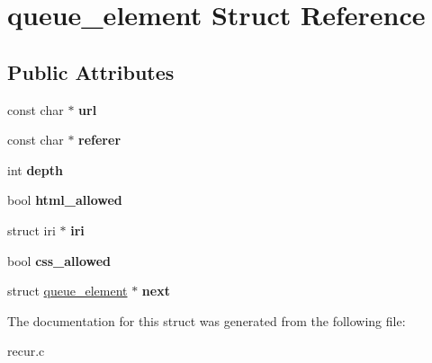 \hypertarget{structqueue__element}{}\section{queue\+\_\+element Struct Reference}
\label{structqueue__element}
\subsection*{Public Attributes}
\begin{DoxyCompactItemize}
\item 
\mbox{\label{structqueue__element_ada8ba081f1fb8d803d75e912253a98ef}} 
const char $\ast$ {\bfseries url}
\item 
\mbox{\label{structqueue__element_aa86f466176eda76217b5ed7e692e042b}} 
const char $\ast$ {\bfseries referer}
\item 
\mbox{\label{structqueue__element_a06c215d33862fbb93c966f25530bcffd}} 
int {\bfseries depth}
\item 
\mbox{\label{structqueue__element_a2b2daa4d3b83079c3745b557f6eed6f7}} 
bool {\bfseries html\+\_\+allowed}
\item 
\mbox{\label{structqueue__element_ab992d1d3fe3eacc2a6176f3052100199}} 
struct iri $\ast$ {\bfseries iri}
\item 
\mbox{\label{structqueue__element_a969875b0b9671195c1b98ea9066d90e7}} 
bool {\bfseries css\+\_\+allowed}
\item 
\mbox{\label{structqueue__element_a50b091d8714f35818348a4da5099e99e}} 
struct \mbox{\hyperlink{structqueue__element}{queue\+\_\+element}} $\ast$ {\bfseries next}
\end{DoxyCompactItemize}


The documentation for this struct was generated from the following file\+:\begin{DoxyCompactItemize}
\item 
recur.\+c\end{DoxyCompactItemize}
